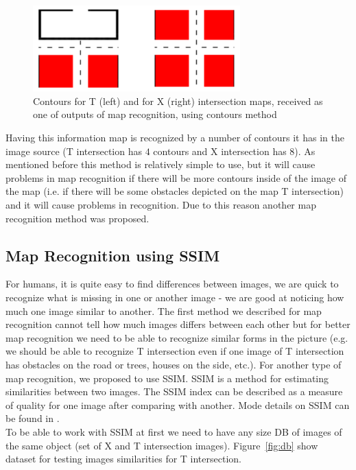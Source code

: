 \begin{figure}[H]
	\centering  	
	\includegraphics[width=8cm]{img/countours.png}
	\caption{Contours for T (left) and for X (right) intersection maps, received as one of outputs of map recognition, using contours method}
	\label{fig:count}    
\end{figure}

Having this information map is recognized by a number of contours it has in the image source (T intersection has $4$ contours and X intersection has $8$). As mentioned before this method is relatively simple to use, but it will cause problems in map recognition if there will be more contours inside of the image of the map (i.e. if there will be some obstacles depicted on the map T intersection) and it will cause problems in recognition. Due to this reason another map recognition method was proposed.

\subsection{Map Recognition using \gls{SSIM}}

For humans, it is quite easy to find differences between images, we are quick to recognize what is missing in one or another image - we are good at noticing how much one image similar to another. The first method we described for map recognition cannot tell how much images differs between each other but for better map recognition we need to be able to recognize similar forms in the picture (e.g. we should be able to recognize T intersection even if one image of T intersection has obstacles on the road or trees, houses on the side, etc.). For another type of map recognition, we proposed to use \gls{SSIM}. \gls{SSIM} is a method for estimating similarities between two images. The \gls{SSIM} index can be described as a measure of quality for one image after comparing with another. Mode details on \gls{SSIM} can be found in \cite{SSIM}.\\
To be able to work with \gls{SSIM} at first we need to have any size \gls{DB} of images of the same object (set of X and T intersection images). Figure~\ref{fig:db} show dataset for testing images similarities for T intersection. 

